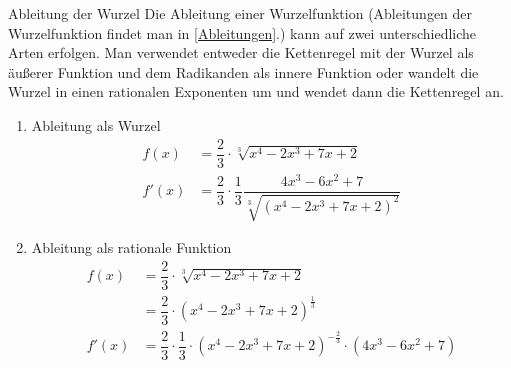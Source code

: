 \begin{bem}{Ableitung der Wurzel}{}
Die Ableitung einer Wurzelfunktion (Ableitungen der Wurzelfunktion findet man in \ref{Ableitungen}.) kann auf zwei unterschiedliche Arten erfolgen. Man verwendet entweder die Kettenregel mit der Wurzel als äußerer Funktion und dem Radikanden als innere Funktion oder wandelt die Wurzel in einen rationalen Exponenten um und wendet dann die Kettenregel an.
\begin{enumerate}
    \item Ableitung als Wurzel
    \begin{equation*}
        \begin{split}
            f(x) &= \dfrac{2}{3} \cdot \sqrt[3]{x^4-2x^3 +7x+2}\\
            f'(x) &= \dfrac{2}{3} \cdot \dfrac{1}{3} \dfrac{4x^3-6x^2+7}{\sqrt[3]{(x^4-2x^3 +7x+2)^2}} 
        \end{split}
    \end{equation*}
    \item Ableitung als rationale Funktion
    \begin{equation*}
        \begin{split}
            f(x) &= \dfrac{2}{3} \cdot \sqrt[3]{x^4-2x^3 +7x+2}\\
            &= \dfrac{2}{3} \cdot (x^4-2x^3+7x+2)^{\frac{1}{3}}\\
            f'(x) &= \dfrac{2}{3} \cdot \dfrac{1}{3} \cdot (x^4-2x^3+7x+2)^{-\frac{2}{3}} \cdot (4x^3-6x^2+7)
        \end{split}
    \end{equation*}
\end{enumerate}
 \end{bem}

